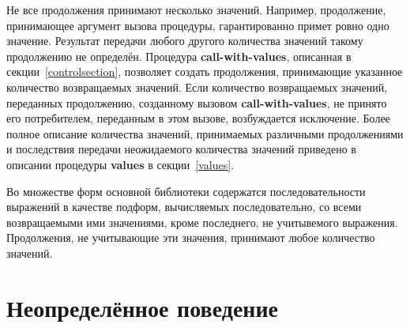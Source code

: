 Не все продолжения принимают несколько значений. Например, продолжение, принимающее аргумент
вызова процедуры, гарантированно примет ровно одно значение. Результат передачи любого другого
количества значений такому продолжению не определён. Процедура {\bfseries\cf call-with-values},
описанная в секции~\ref{controlsection}, позволяет создать продолжения, принимающие указанное
количество возвращаемых значений. Если количество возвращаемых значений, переданных продолжению,
созданному вызовом {\bfseries\cf call-with-values}, не принято его потребителем, переданным в
этом вызове, возбуждается исключение. Более полное описание количества значений, принимаемых
различными продолжениями и последствия передачи неожидаемого количества значений приведено в
описании процедуры {\bfseries\cf values} в секции~\ref{values}.

Во множестве форм основной библиотеки содержатся последовательности выражений в качестве подформ,
вычисляемых последовательно, со всеми возвращаемыми ими значениями, кроме последнего, не учитывемого
выражения. Продолжения, не учитывающие эти значения, принимают любое количество значений.\vspace{-4mm}

\section{Неопределённое поведение}\vspace{-2mm}

